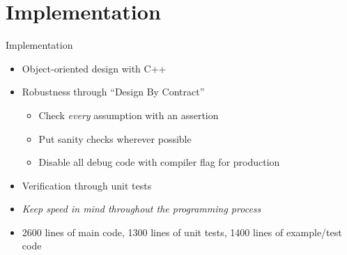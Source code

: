 \documentclass[color={usenames, dvipsnames},ignorenonframetext]{beamer}
\begin{document}
\section{Implementation}
\begin{frame}{Implementation}
\begin{itemize}
  \item Object-oriented design with C++
  \item Robustness through ``Design By Contract''
    \begin{itemize}
      \item Check \emph{every} assumption with an assertion
      \item Put sanity checks wherever possible
      \item Disable all debug code with compiler flag for production
    \end{itemize}
  \item Verification through unit tests
  \item \emph{Keep speed in mind throughout the programming process}
  \item 2600 lines of main code, 1300 lines of unit tests, 1400 lines of
    example/test code
\end{itemize}
\end{frame}
\end{document}
